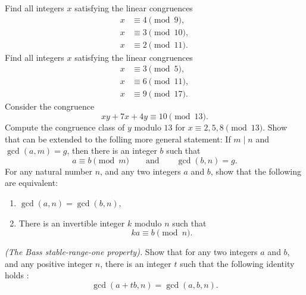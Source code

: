 \begin{routine}
  \exercise Find all integers $x$ satisfying the linear congruences
  \begin{align*}
    x & \equiv 4 \pmod{9},\\
    x & \equiv 3 \pmod{10},\\
    x & \equiv 2 \pmod{11}.
  \end{align*}
  \exercise Find all integers $x$ satisfying the linear congruences
  \begin{align*}
    x & \equiv 3 \pmod{5}, \\
    x & \equiv 6 \pmod{11}, \\
    x & \equiv 9 \pmod{17}.
  \end{align*}
  \exercise Consider the congruence
  \begin{equation*}
    xy + 7x + 4y \equiv 10\pmod{13}.
  \end{equation*}
  Compute the congruence class of $y$ modulo $13$ for $x\equiv 2,5,8\pmod{13}$.
  \exercise Show that  can be extended to the folling more general statement: If $m\mid n$ and $\gcd(a,m)=g$, then there is an integer $b$ such that
  \begin{equation*}
    a\equiv b\pmod{m}\qquad\text{and}\qquad \gcd(b,n)=g.
  \end{equation*}
  \exercise For any natural number $n$, and any two integers $a$ and $b$, show that the following are equivalent:
  \begin{enumerate}
  \item $\gcd(a,n)=\gcd(b,n)$,
  \item There is an invertible integer $k$ modulo $n$ such that
    \begin{equation*}
      ka\equiv b\pmod{n}.
    \end{equation*}
  \end{enumerate}
\end{routine}

\begin{challenge}
  \exercise \emph{(The Bass stable-range-one property).} Show that for any two integers $a$ and $b$, and any positive integer $n$, there is an integer $t$ such that the following identity holds \cite[Corollary 6.5]{bass1964}:
  \begin{equation*}
    \gcd(a+tb,n)=\gcd(a,b,n).
  \end{equation*}
\end{challenge}

